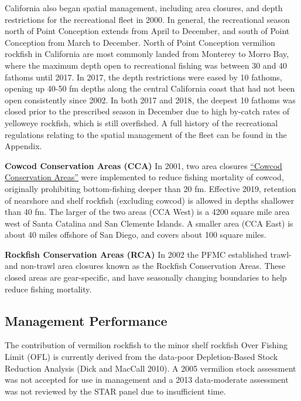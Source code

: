 \documentclass[
  english,
  a4paper,
]{article}
\begin{document}
California also began spatial management, including area closures, and depth
restrictions for the recreational fleet in 2000. In general, the recreational
season north of Point Conception
extends from April to December, and south of Point Conception from March to December.
North of Point Conception vermilion rockfish in California are most commonly landed from
Monterey to Morro Bay, where the
maximum depth open to recreational fishing was between 30 and 40
fathoms until 2017. In 2017, the depth restrictions were eased by 10 fathoms,
opening up 40-50 fm depths along the central California coast that had not been
open consistently since 2002. In
both 2017 and 2018, the deepest 10 fathoms was closed prior to the prescribed
season in December due to high by-catch rates of yelloweye rockfish, which is still
overfished. A full history of the recreational
regulations relating to the spatial management of the fleet can be found in the Appendix.

\textbf{Cowcod Conservation Areas (CCA)}
In 2001, two area closures \href{https://nrm.dfg.ca.gov/FileHandler.ashx?DocumentID=36132\&inline}{``Cowcod Conservation Areas''} were implemented to reduce fishing mortality of cowcod, originally prohibiting
bottom-fishing deeper than 20 fm. Effective 2019, retention of nearshore and
shelf rockfish (excluding cowcod) is allowed in depths shallower than 40 fm.
The larger of the two areas (CCA West) is a 4200 square mile area west of Santa
Catalina and San Clemente Islands. A smaller area (CCA East) is about 40 miles
offshore of San Diego, and covers about 100 square miles.

\textbf{Rockfish Conservation Areas (RCA)}
In 2002 the PFMC established trawl- and non-trawl area closures known as the
Rockfish Conservation Areas. These closed areas are gear-specific, and have
seasonally changing boundaries to help reduce fishing mortality.

\hypertarget{management-performance-1}{%
\subsection{Management Performance}\label{management-performance-1}}

The contribution of vermilion rockfish to the minor shelf rockfish Over Fishing Limit (OFL) is
currently derived from the data-poor Depletion-Based Stock Reduction
Analysis (Dick and MacCall 2010). A 2005 vermilion stock assessment was not accepted for use
in management and a 2013 data-moderate assessment was not reviewed by the STAR
panel due to insufficient time.
\end{document}
